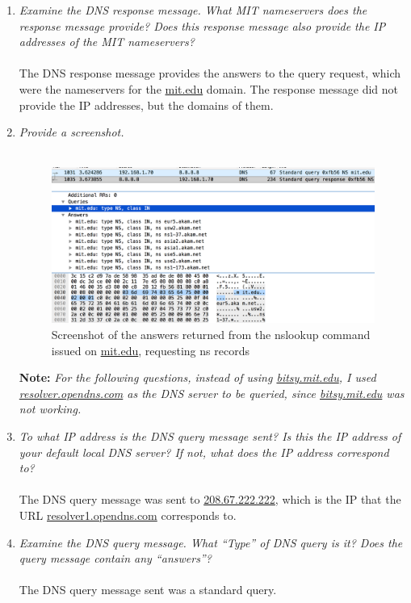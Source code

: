 \documentclass[12pt]{article}
\begin{document}
\begin{enumerate}
	\item{\textit{Examine the DNS response message. What MIT nameservers does the response message provide? Does this response message also provide the IP addresses of the MIT nameservers?}}\\ \\
		The DNS response message provides the answers to the query request, which were the nameservers for the \url{mit.edu} domain. The response message did not provide the IP addresses, but the domains of them.
	\item{\textit{Provide a screenshot.}}\\ \\ 
		\begin{figure}[H]
			\centering
			\includegraphics[width=1.0\textwidth]{19}%
			\caption{Screenshot of the answers returned from the nslookup command issued on \url{mit.edu}, requesting ns records}
		\end{figure}

		\textbf{Note: }\textit{For the following questions, instead of using \url{bitsy.mit.edu}, I used \url{resolver.opendns.com} as the DNS server to be queried, since \url{bitsy.mit.edu} was not working.}
 
	\item{\textit{To what IP address is the DNS query message sent? Is this the IP address of your default local DNS server? If not, what does the IP address correspond to?}}\\ \\
		The DNS query message was sent to \url{208.67.222.222}, which is the IP that the URL \url{resolver1.opendns.com} corresponds to.

	\item{\textit{Examine the DNS query message. What “Type” of DNS query is it? Does the query message contain any “answers”?}}\\ \\
		The DNS query message sent was a standard query.



\end{enumerate}
\end{document}
